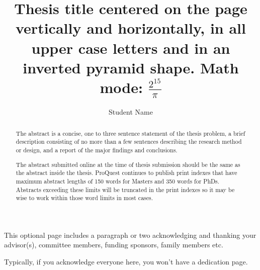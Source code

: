 \documentclass[12pt]{mines-thesis}
\begin{document}
	\autotitle %
	\title{Thesis title centered on the page vertically and horizontally, in all upper case letters
		and in an inverted pyramid shape. Math mode: $\frac{2^{15}}{\pi}$
	}
	
	\author{Student Name}  %
	
	
	\begin{abstract}
		The abstract is a concise, one to three sentence statement of the thesis problem, a brief description consisting of no more than a few sentences describing the research method or design, and a report of the major findings and conclusions.
		
		The abstract submitted online at the time of thesis submission should be the same as the abstract inside the thesis. ProQuest continues to publish print indexes that have maximum abstract lengths of 150 words for Masters and 350 words for PhDs. Abstracts exceeding these limits will be truncated in the print indexes so it may be wise to work within those word limits in most cases.
	\end{abstract}

	\begin{acknowledgment}
		This optional page includes a paragraph or two acknowledging and thanking your
		advisor(s), committee members, funding sponsors, family members etc.
		
		Typically, if you acknowledge everyone here, you won’t have a dedication page.
	\end{acknowledgment}
\end{document}
